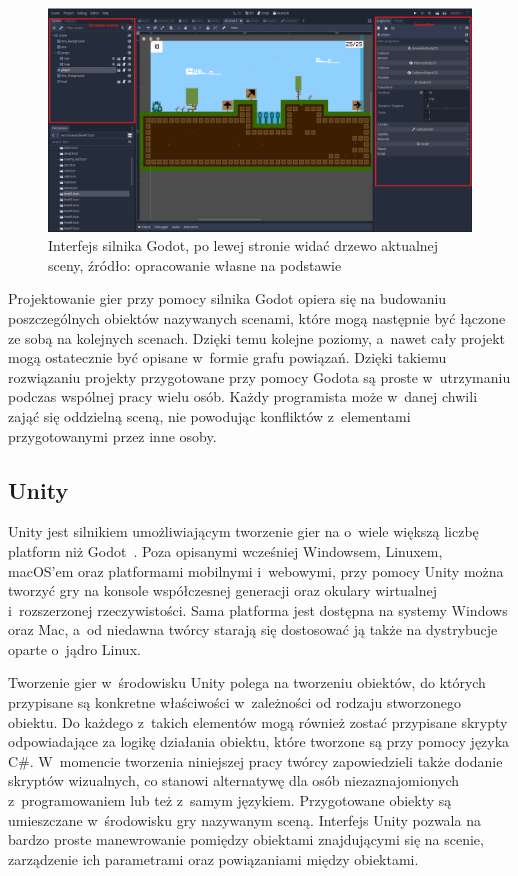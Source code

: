 \begin{figure}[h]
	\centering
	\includegraphics[width=0.9\linewidth]{images/godot_interface.png}
	\caption{Interfejs silnika Godot, po lewej stronie widać drzewo aktualnej sceny, źródło: opracowanie własne na podstawie~\cite{godot_documentation}}
	\label{fig:godot_interface}
\end{figure}

Projektowanie gier przy pomocy silnika Godot opiera się na budowaniu poszczególnych obiektów nazywanych scenami, które mogą następnie być łączone ze sobą na kolejnych scenach. Dzięki temu kolejne poziomy, a~nawet cały projekt mogą ostatecznie być opisane w~formie grafu powiązań. Dzięki takiemu rozwiązaniu projekty przygotowane przy pomocy Godota są proste w~utrzymaniu podczas wspólnej pracy wielu osób. Każdy programista może w~danej chwili zająć się oddzielną sceną, nie powodując konfliktów z~elementami przygotowanymi przez inne osoby.

\subsection{Unity}
Unity jest silnikiem umożliwiającym tworzenie gier na o~wiele większą liczbę platform niż Godot~\cite{unity_manual}. Poza opisanymi wcześniej Windowsem, Linuxem, macOS'em oraz platformami mobilnymi i~webowymi, przy pomocy Unity można tworzyć gry na konsole współczesnej generacji oraz okulary wirtualnej i~rozszerzonej rzeczywistości. Sama platforma jest dostępna na systemy Windows oraz Mac, a~od niedawna twórcy starają się dostosować ją także na dystrybucje oparte o~jądro Linux. 

Tworzenie gier w~środowisku Unity polega na tworzeniu obiektów, do których przypisane są konkretne właściwości w~zależności od rodzaju stworzonego obiektu. Do każdego z~takich elementów mogą również zostać przypisane skrypty odpowiadające za logikę działania obiektu, które tworzone są przy pomocy języka C\#. W~momencie tworzenia niniejszej pracy twórcy zapowiedzieli także dodanie skryptów wizualnych, co stanowi alternatywę dla osób niezaznajomionych z~programowaniem lub też z~samym językiem. Przygotowane obiekty są umieszczane w~środowisku gry nazywanym sceną. Interfejs Unity pozwala na bardzo proste manewrowanie pomiędzy obiektami znajdującymi się na scenie, zarządzenie ich parametrami oraz powiązaniami między obiektami.

